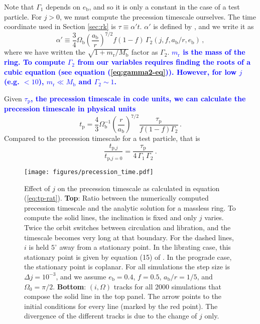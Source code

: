 \documentclass[twocolumn,linenumbers]{aastex631}
\newcommand{\RR}[1]{\textcolor{blue}{\bf#1}} %
\begin{document}
Note that $\Gamma_1$ depends on $e_\text{b}$, and so it is only a constant in the case of a test particle. For $j>0$, we must compute the precession timescale ourselves. The time coordinate used in Section \ref{sec:rk} is $\tau \equiv \alpha' t$. $\alpha'$ is defined by \citet[see eq. 3.9]{farago2010}, and we write it as
\begin{equation}
    \alpha' \equiv \frac{3}{4} \Omega_\text{b} \left(\frac{a_\text{b}}{r}\right)^{7/2} f(1-f) \,\Gamma_2(j,f,a_\text{b}/r, e_\text{b}) \, ,
\end{equation}
where we have written the $\sqrt{1+m_\text{r}/M_\text{b}}$ factor as $\Gamma_2$. \RR{$m_\text{r}$ is the mass of the ring. To compute $\Gamma_2$ from our variables requires finding the roots of a cubic equation (see equation (\ref{eq:gamma2-eq})). However, for low $j$ (e.g. $<10$), $m_\text{r} \ll M_\text{b}$ and $\Gamma_2 \sim 1$.}

Given \RR{$\tau_\text{p}$, the precession timescale in code units, we can calculate the precession timescale in physical units}
\begin{equation}
    \label{eq:tp-j}
    t_\text{p} = \frac{4}{3}\Omega_\text{b}^{-1} \left(\frac{r}{a_\text{b}}\right)^{7/2} \frac{\tau_\text{p}}{f(1-f)\Gamma_2}\, .
\end{equation}
Compared to the precession timescale for a test particle, that is
\begin{equation}
    \label{eq:tp-rat}
    \frac{t_{\text{p,}j}}{t_{\text{p,}j=0}} = \frac{\tau_\text{p}}{4\,\Gamma_1\,\Gamma_2} \, .
\end{equation}

\begin{figure}
    \texttt{[image: figures/precession\_time.pdf]}
    \caption{
        Effect of $j$ on the precession timescale as calculated in equation (\ref{eq:tp-rat}). {\bf Top}: Ratio between the numerically computed precession timescale and the analytic solution for a massless ring. To compute the solid lines, the inclination is fixed and only $j$ varies. Twice the orbit switches between circulation and libration, and the timescale becomes very long at that boundary. For the dashed lines, $i$ is held $5^\circ$ away from a stationary point. In the librating case, this stationary point is given by equation (15) of \citet{martin2019}. In the prograde case, the stationary point is coplanar. For all simulations the step size is $\Delta j = 10^{-3}$, and we assume $e_\text{b}=0.4$, $f=0.5$, $a_\text{b}/r = 1/5$, and $\Omega_0 = \pi/2$. {\bf Bottom}: $(i,\Omega)$ tracks for all 2000 simulations that compose the solid line in the top panel. The arrow points to the initial conditions for every line (marked by the red point). The divergence of the different tracks is due to the change of $j$ only.
    }
    \label{fig:t_p}
\end{figure}
\end{document}
